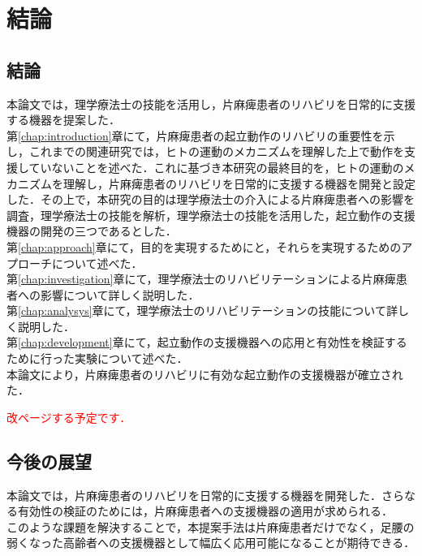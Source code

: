 \chapter{結論}
\label{chap:conclusion}
\minitoc

\thispagestyle{empty}

\newpage
\section{結論}
\label{sec:conclusion_chap6}

本論文では，理学療法士の技能を活用し，片麻痺患者のリハビリを日常的に支援する機器を提案した．\\

第\ref{chap:introduction}章にて，片麻痺患者の起立動作のリハビリの重要性を示し，これまでの関連研究では，ヒトの運動のメカニズムを理解した上で動作を支援していないことを述べた．これに基づき本研究の最終目的を，ヒトの運動のメカニズムを理解し，片麻痺患者のリハビリを日常的に支援する機器を開発と設定した．その上で，本研究の目的は理学療法士の介入による片麻痺患者への影響を調査，理学療法士の技能を解析，理学療法士の技能を活用した，起立動作の支援機器の開発の三つであるとした．\\

第\ref{chap:approach}章にて，目的を実現するためにと，それらを実現するためのアプローチについて述べた．
\\

第\ref{chap:investigation}章にて，理学療法士のリハビリテーションによる片麻痺患者への影響について詳しく説明した．\\

第\ref{chap:analysys}章にて，理学療法士のリハビリテーションの技能について詳しく説明した．\\

第\ref{chap:development}章にて，起立動作の支援機器への応用と有効性を検証するために行った実験について述べた．\\

本論文により，片麻痺患者のリハビリに有効な起立動作の支援機器が確立された．

\textcolor{red}{改ページする予定です．}

\section{今後の展望}
\label{sec:future_work}

本論文では，片麻痺患者のリハビリを日常的に支援する機器を開発した．さらなる有効性の検証のためには，片麻痺患者への支援機器の適用が求められる．\\

このような課題を解決することで，本提案手法は片麻痺患者だけでなく，足腰の弱くなった高齢者への支援機器として幅広く応用可能になることが期待できる．

\clearpage
